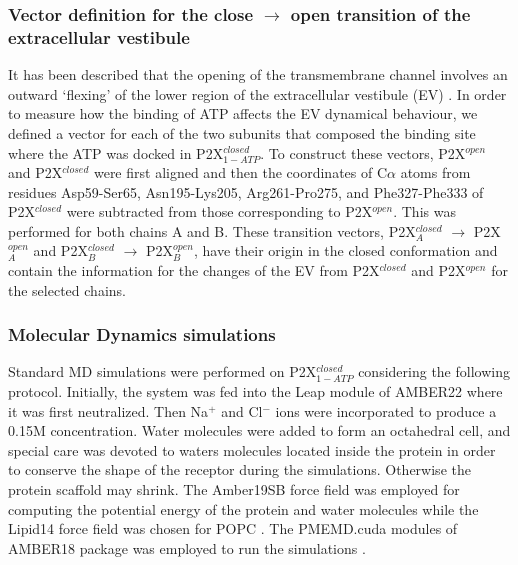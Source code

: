 \documentclass[pdflatex,sn-nature]{sn-jnl}%
\begin{document}
\subsubsection{Vector definition for the close \texorpdfstring{$\longrightarrow$}{->} open transition of the extracellular vestibule}


It has been described that the opening of the transmembrane channel involves an outward ‘flexing’ of the lower region of the extracellular vestibule (EV) \cite{abierta_p2x}. In order to measure how the binding of ATP affects the EV dynamical behaviour, we defined a vector for each of the two subunits that composed the binding site where the ATP was docked in P2X$^{closed}_{1-ATP}$. To construct these vectors, P2X$^{open}$ and P2X$^{closed}$ were first aligned and then the
coordinates of C$\alpha$ atoms from residues Asp59-Ser65, Asn195-Lys205, Arg261-Pro275, and Phe327-Phe333 of P2X$^{closed}$ were subtracted from those corresponding to  P2X$^{open}$. 
This was performed for both chains A and B. These transition vectors, P2X$^{closed}_A$ $\rightarrow$ P2X$^{open}_A$ and P2X$^{closed}_B$ $\rightarrow$ P2X$^{open}_B$, have their origin in the closed conformation and contain the information for the changes of the EV from P2X$^{closed}$ and P2X$^{open}$ for the selected chains. 

\subsubsection{Molecular Dynamics simulations}
\label{sec:met_md_simulations}

Standard MD simulations were performed on P2X$^{closed}_{1-ATP}$ considering the following protocol.
Initially, the system was fed into the Leap module of AMBER22 where it was first neutralized. Then Na$^+$ and Cl$^-$ ions were incorporated to produce a 0.15M concentration. Water molecules were added to form an octahedral cell, and special care was devoted to waters molecules located inside the protein in order to conserve the shape of the receptor during the simulations. 
Otherwise the protein scaffold may shrink.
The Amber19SB force field \cite{tian2019ff19sb} was employed for computing the potential energy of the protein and water molecules while the Lipid14 force field was chosen for POPC \cite{lipid14}. 
The PMEMD.cuda modules of AMBER18 package was employed to run the simulations \cite{amber18}.
\end{document}
